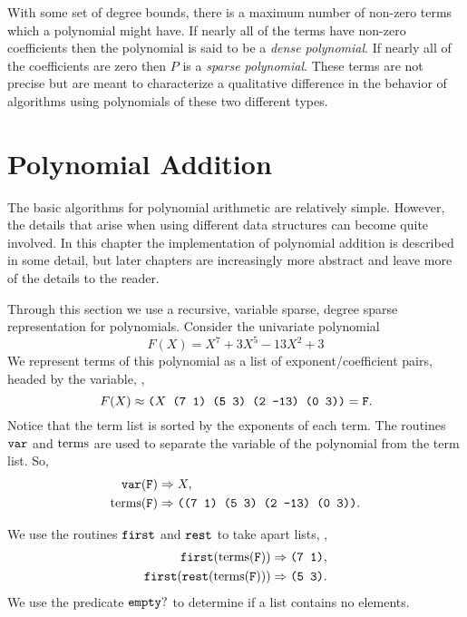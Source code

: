 With some set of degree bounds, there is a maximum number of non-zero
terms which a polynomial might have.   
If nearly all of the terms have non-zero coefficients then the polynomial
is said to be a {\em dense polynomial\/}.  If nearly all of the
coefficients are zero then $P$ is a {\em sparse polynomial\/}.  These
terms are not precise but are meant to characterize a qualitative
difference in the behavior of algorithms using polynomials of these
two different types.  

\section{Polynomial Addition}
\label{Poly:Add:Sec}
\newcommand{\cons}{\mathop{\tt cons}\nolimits}
\newcommand{\first}{\mathop{\tt first}\nolimits}
\newcommand{\rest}{\mathop{\tt rest}\nolimits}
\newcommand{\emptyp}{\mathop{\tt empty?}\nolimits}
\newcommand{\coefp}{\mathop{\tt coef?}\nolimits}
\newcommand{\var}{\mathop{\tt var}\nolimits}


The basic algorithms for polynomial arithmetic are relatively simple.
However, the details that arise when using different data structures
can become quite involved.  In this chapter the implementation of
polynomial addition is described in some detail, but later chapters
are increasingly more abstract and leave more of the details to the
reader.

Through this section we use a recursive, variable sparse, degree
sparse representation for polynomials.  Consider the univariate
polynomial
\[
F(X) = X^7 + 3X^5 - 13X^2 +3
\]
We represent terms of this polynomial as a list of
exponent/coefficient pairs, headed by the variable, \ie, 
\[
F(X) \approx \mbox{\tt ($X$ (7 1) (5 3) (2 -13) (0 3))} = \mbox{\tt F}.
\]
Notice that the term list is sorted by the exponents of each term.
The routines $\var$ and $\operatorname{terms}$ are used to separate the variable of
the polynomial from the term list.  So,
\[
\begin{aligned}
\var(\mbox{\tt F})& \Rightarrow X, \\
\terms(\mbox{\tt F}) & \Rightarrow \mbox{\tt ((7 1) (5 3) (2 -13) (0 3))}.
\end{aligned}
\]

We use the routines $\first$ and $\rest$ to take apart lists, \viz,
\[
\begin{aligned}
\first(\terms(\mbox{\tt F}))& \Rightarrow \mbox{\tt (7 1)},\\
\first(\rest(\terms(\mbox{\tt F})))& \Rightarrow \mbox{\tt (5 3)}. \\
\end{aligned}
\]
We use the predicate $\emptyp$ to determine if a list contains no
elements.

